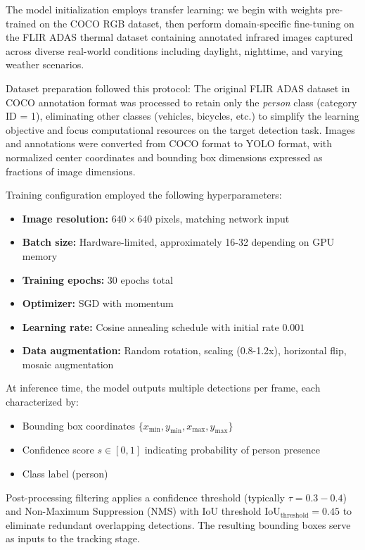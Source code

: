\documentclass[conference]{IEEEtran}
\begin{document}
The model initialization employs transfer learning: we begin with weights pre-trained on the COCO RGB dataset, then perform domain-specific fine-tuning on the FLIR ADAS thermal dataset containing annotated infrared images captured across diverse real-world conditions including daylight, nighttime, and varying weather scenarios.

Dataset preparation followed this protocol: The original FLIR ADAS dataset in COCO annotation format was processed to retain only the \textit{person} class (category ID = 1), eliminating other classes (vehicles, bicycles, etc.) to simplify the learning objective and focus computational resources on the target detection task. Images and annotations were converted from COCO format to YOLO format, with normalized center coordinates and bounding box dimensions expressed as fractions of image dimensions.

Training configuration employed the following hyperparameters:
\begin{itemize}
\item \textbf{Image resolution:} $640 \times 640$ pixels, matching network input
\item \textbf{Batch size:} Hardware-limited, approximately 16-32 depending on GPU memory
\item \textbf{Training epochs:} 30 epochs total
\item \textbf{Optimizer:} SGD with momentum
\item \textbf{Learning rate:} Cosine annealing schedule with initial rate $0.001$
\item \textbf{Data augmentation:} Random rotation, scaling (0.8-1.2x), horizontal flip, mosaic augmentation
\end{itemize}

At inference time, the model outputs multiple detections per frame, each characterized by:
\begin{itemize}
\item Bounding box coordinates $\{x_{\text{min}}, y_{\text{min}}, x_{\text{max}}, y_{\text{max}}\}$
\item Confidence score $s \in [0,1]$ indicating probability of person presence
\item Class label (person)
\end{itemize}

Post-processing filtering applies a confidence threshold (typically $\tau = 0.3-0.4$) and Non-Maximum Suppression (NMS) with IoU threshold $\text{IoU}_{\text{threshold}} = 0.45$ to eliminate redundant overlapping detections. The resulting bounding boxes serve as inputs to the tracking stage.
\end{document}
